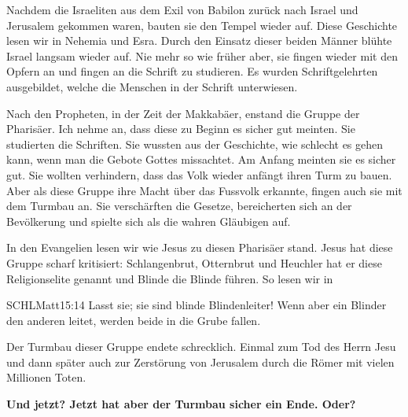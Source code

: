 \documentclass[fontsize=16pt]{mybib}
\begin{document}
\begin{otsblock}
    Nachdem die Israeliten aus dem Exil von Babilon zurück nach Israel und Jerusalem gekommen waren, bauten sie den Tempel wieder auf. Diese Geschichte lesen wir in Nehemia und Esra. Durch den Einsatz dieser beiden Männer blühte Israel langsam wieder auf. Nie mehr so wie früher aber, sie fingen wieder mit den Opfern an und fingen an die Schrift zu studieren. Es wurden Schriftgelehrten ausgebildet, welche die Menschen in der Schrift unterwiesen. 
    
    Nach den Propheten, in der Zeit der Makkabäer, enstand die Gruppe der Pharisäer. Ich nehme an, dass diese zu Beginn es sicher gut meinten. Sie studierten die Schriften. Sie wussten aus der Geschichte, wie schlecht es gehen kann, wenn man die Gebote Gottes missachtet. Am Anfang meinten sie es sicher gut. Sie wollten verhindern, dass das Volk wieder anfängt ihren Turm zu bauen. Aber als diese Gruppe ihre Macht über das Fussvolk erkannte, fingen auch sie mit dem Turmbau an. Sie verschärften die Gesetze, bereicherten sich an der Bevölkerung und spielte sich als die wahren Gläubigen auf.
    
    In den Evangelien lesen wir wie Jesus zu diesen Pharisäer stand. Jesus hat diese Gruppe scharf kritisiert:  Schlangenbrut, Otternbrut und Heuchler hat er diese Religionselite genannt und Blinde die Blinde führen. So lesen wir in
    \begin{bibelbox}{SCHL}{Matt}{15:14}
        Lasst sie; sie sind blinde Blindenleiter! Wenn aber ein Blinder den anderen leitet, werden beide in die Grube fallen.
    \end{bibelbox} 
    Der Turmbau dieser Gruppe endete schrecklich. Einmal zum Tod des Herrn Jesu und dann später auch zur Zerstörung von Jerusalem durch die Römer mit vielen Millionen Toten. 
    
    \textbf{Und jetzt? Jetzt hat aber der Turmbau sicher ein Ende. Oder?}
\end{otsblock}
\end{document}
